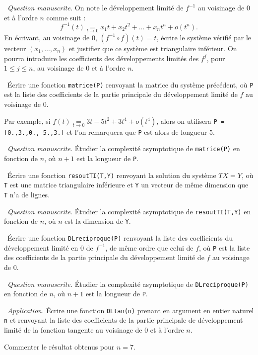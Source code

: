 \medskip

\question\ \emph{Question manuscrite.} On note le développement limité de $f^{-1}$ au voisinage de $0$ et à l'ordre $n$ comme suit : 
\begin{equation*}
  f^{-1}(t) \underset{t\to0}{=} x_1t + x_2t^2 + \dots +x_n t^n + o(t^n).
\end{equation*}
En écrivant, au voisinage de $0$, $(f^{-1}\circ f)(t) = t$, écrire le système vérifié par le vecteur $(x_1,\dots ,x_n)$ et justifier que ce système est triangulaire inférieur. 
On pourra introduire les coefficients des développements limités des $f^j$, pour $1 \leq j \leq n$, au voisinage de $0$ et à l'ordre $n$. 

\medskip

\question\ Écrire une fonction \texttt{matrice(P)} renvoyant la matrice du système précédent, où \texttt{P} est la liste des coefficients de la partie principale du développement limité de $f$ au voisinage de $0$.

Par exemple, si $f(t) \underset{t\to0}{=} 3t - 5t^2 + 3t^4 + o(t^4)$, alors on utilisera \texttt{P = [0.,3.,0.,-5.,3.]} et l'on remarquera que \texttt{P} est alors de longueur $5$.

\medskip

\question\ \emph{Question manuscrite.} Étudier la complexité asymptotique de \texttt{matrice(P)} en fonction de $n$, où $n+1$ est la longueur de \texttt{P}. 

\medskip

\question\ Écrire une fonction \texttt{resoutTI(T,Y)} renvoyant la solution du système $TX=Y$, où \texttt{T} est une matrice triangulaire inférieure et \texttt{Y} un vecteur de même dimension que \texttt{T} n'a de lignes. 

\medskip

\question\ \emph{Question manuscrite.} Étudier la complexité asymptotique de \texttt{resoutTI(T,Y)} en fonction de $n$, où $n$ est la dimension de \texttt{Y}. 

\medskip

\question\ Écrire une fonction \texttt{DLreciproque(P)} renvoyant la liste des coefficients du développement limité en $0$ de $f^{-1}$, de même ordre que celui de $f$, où \texttt{P} est la liste des coefficients de la partie principale du développement limité de $f$ au voisinage de $0$.

\medskip

\question\ \emph{Question manuscrite.} Étudier la complexité asymptotique de \texttt{DLreciproque(P)} en fonction de $n$, où $n+1$ est la longueur de \texttt{P}.  

\medskip

\question\ \emph{Application.} Écrire une fonction \texttt{DLtan(n)} prenant en argument en entier naturel \texttt{n} et renvoyant la liste des coefficients de la partie principale de développement limité de la fonction tangente au voisinage de $0$ et à l'ordre $n$. 

Commenter le résultat obtenus pour $n=7$. 